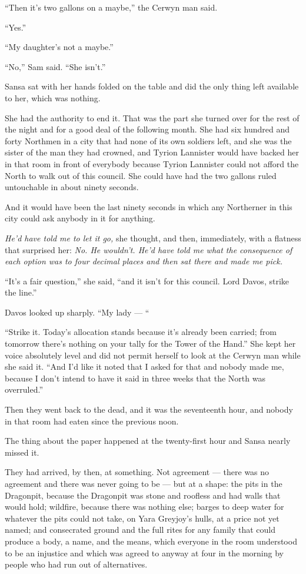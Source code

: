 “Then it’s two gallons on a maybe,” the Cerwyn man said.

“Yes.”

“My daughter’s not a maybe.”

“No,” Sam said. “She isn’t.”

\sceneBreak

Sansa sat with her hands folded on the table and did the only thing left available to her, which was nothing.

She had the authority to end it. That was the part she turned over for the rest of the night and for a good deal of the following month. She had six hundred and forty Northmen in a city that had none of its own soldiers left, and she was the sister of the man they had crowned, and Tyrion Lannister would have backed her in that room in front of everybody because Tyrion Lannister could not afford the North to walk out of this council. She could have had the two gallons ruled untouchable in about ninety seconds.

And it would have been the last ninety seconds in which any Northerner in this city could ask anybody in it for anything.

\textit{He’d have told me to let it go,} she thought, and then, immediately, with a flatness that surprised her: \textit{No. He wouldn’t. He’d have told me what the consequence of each option was to four decimal places and then sat there and made me pick.}

“It’s a fair question,” she said, “and it isn’t for this council. Lord Davos, strike the line.”

Davos looked up sharply. “My lady — “

“Strike it. Today’s allocation stands because it’s already been carried; from tomorrow there’s nothing on your tally for the Tower of the Hand.” She kept her voice absolutely level and did not permit herself to look at the Cerwyn man while she said it. “And I’d like it noted that I asked for that and nobody made me, because I don’t intend to have it said in three weeks that the North was overruled.”

Then they went back to the dead, and it was the seventeenth hour, and nobody in that room had eaten since the previous noon.

\sceneBreak

The thing about the paper happened at the twenty-first hour and Sansa nearly missed it.

They had arrived, by then, at something. Not agreement — there was no agreement and there was never going to be — but at a shape: the pits in the Dragonpit, because the Dragonpit was stone and roofless and had walls that would hold; wildfire, because there was nothing else; barges to deep water for whatever the pits could not take, on Yara Greyjoy’s hulls, at a price not yet named; and consecrated ground and the full rites for any family that could produce a body, a name, and the means, which everyone in the room understood to be an injustice and which was agreed to anyway at four in the morning by people who had run out of alternatives.

